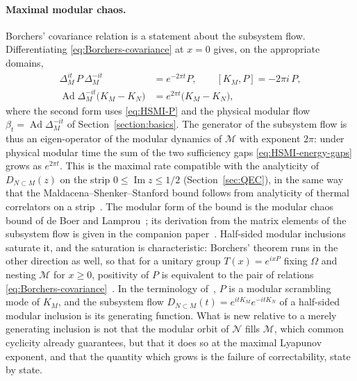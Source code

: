 \documentclass[a4paper,11pt]{article}
\theoremstyle{definition}
\newcommand{\nn}{\nonumber}
\begin{document}
\paragraph{Maximal modular chaos.}
Borchers' covariance relation is a statement about the subsystem flow. Differentiating \eqref{eq:Borchers-covariance} at $x=0$ gives, on the appropriate domains,
\begin{align}
 \Delta_M^{it}\,P\,\Delta_M^{-it}&=e^{-2\pi t}P,\qquad [K_M,P]=-2\pi i\,P,\nn\\
 \operatorname{Ad}\Delta_M^{-it}\bigl(K_M-K_N\bigr)&=e^{2\pi t}\bigl(K_M-K_N\bigr),
 \label{eq:modular-Lyapunov}
\end{align}
where the second form uses \eqref{eq:HSMI-P} and the physical modular flow $\beta_t=\operatorname{Ad}\Delta_M^{-it}$ of Section~\ref{section:basics}. The generator of the subsystem flow is thus an eigen-operator of the modular dynamics of $\mathcal M$ with exponent $2\pi$: under physical modular time the sum of the two sufficiency gaps \eqref{eq:HSMI-energy-gaps} grows as $e^{2\pi t}$. This is the maximal rate compatible with the analyticity of $D_{N\subset M}(z)$ on the strip $0\le\operatorname{Im}z\le1/2$ (Section~\ref{sec:QEC}), in the same way that the Maldacena--Shenker--Stanford bound follows from analyticity of thermal correlators on a strip~\cite{MSS2016}. The modular form of the bound is the modular chaos bound of de Boer and Lamprou~\cite{deBoerLamprou2020}; its derivation from the matrix elements of the subsystem flow is given in the companion paper~\cite{companionQFT}. Half-sided modular inclusions saturate it, and the saturation is characteristic: Borchers' theorem runs in the other direction as well, so that for a unitary group $T(x)=e^{ixP}$ fixing $\Omega$ and nesting $\mathcal M$ for $x\ge0$, positivity of $P$ is equivalent to the pair of relations \eqref{eq:Borchers-covariance}~\cite{revolutionizing}. In the terminology of~\cite{deBoerLamprou2020}, $P$ is a modular scrambling mode of $K_M$, and the subsystem flow $D_{N\subset M}(t)=e^{itK_M}e^{-itK_N}$ of a half-sided modular inclusion is its generating function. What is new relative to a merely generating inclusion is not that the modular orbit of $\mathcal N$ fills $\mathcal M$, which common cyclicity already guarantees, but that it does so at the maximal Lyapunov exponent, and that the quantity which grows is the failure of correctability, state by state.
\end{document}
